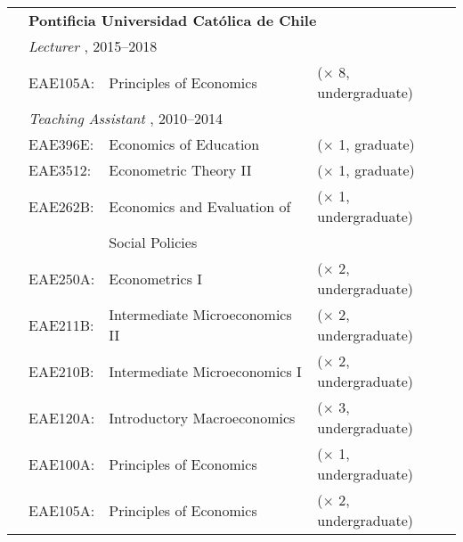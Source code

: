 \begin{tabular}{llll}
	  
	  \indent
	&
	\multicolumn{3}{l}{
		\textbf{%
			Pontificia Universidad Cat\'olica de Chile
		}
	}
	\\[1.5ex]
	
	&
	\multicolumn{3}{l}{
		\textit{%
			Lecturer%
		}%
		,
		2015--2018
	}
	\\[.5ex]
	
	& EAE105A:
	& Principles of Economics
	& ($\times$ 8, undergraduate)
	\\[1em]
	
	&
	\multicolumn{3}{l}{
		\textit{%
			Teaching Assistant%
		}%
		,
		2010--2014
	}
	\\[.5ex]
	
	& EAE396E:
	& Economics of Education
	& ($\times$ 1, graduate)
	\\%
	
	& EAE3512:
	& Econometric Theory II
	& ($\times$ 1, graduate)
	\\%
	
	& EAE262B:
	& Economics and Evaluation of
	& ($\times$ 1, undergraduate)
	\\%
	
	& 
	& Social Policies
	& 
	\\%
	
	& EAE250A:
	& Econometrics I
	& ($\times$ 2, undergraduate)
	\\%
	
	& EAE211B:
	& Intermediate Microeconomics II
	& ($\times$ 2, undergraduate)
	\\%
	
	& EAE210B:
	& Intermediate Microeconomics I
	& ($\times$ 2, undergraduate)
	\\%
	
	& EAE120A:
	& Introductory Macroeconomics
	& ($\times$ 3, undergraduate)
	\\%
	
	& EAE100A:
	& Principles of Economics
	& ($\times$ 1, undergraduate)
	\\%
	
	& EAE105A:
	& Principles of Economics
	& ($\times$ 2, undergraduate)
	\\%
	
\end{tabular}

